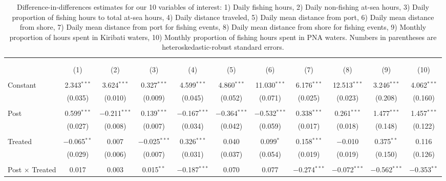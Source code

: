 
\begin{table}[H] \centering 
  \caption{\label{tab:DID_without_USA_TWN}Difference-in-differences estimates for our 10 variables of interest: 1) Daily fishing hours, 2) Daily non-fishing at-sea hours, 3) Daily proportion of fishing hours to total at-sea hours, 4) Daily distance traveled, 5) Daily mean distance from port, 6) Daily mean distance from shore, 7) Daily mean distance from port for fishing events, 8) Daily mean distance from shore for fishing events, 9) Monthly proportion of hours spent in Kiribati waters, 10) Monthly proportion of fishing hours spent in PNA waters. Numbers in parentheses are heteroskedastic-robust standard errors.} 
  \label{} 
\footnotesize 
\begin{tabular}{@{\extracolsep{1pt}}lcccccccccc} 
\\[-1.8ex]\hline 
\hline \\[-1.8ex] 
\\[-1.8ex] & (1) & (2) & (3) & (4) & (5) & (6) & (7) & (8) & (9) & (10)\\ 
\hline \\[-1.8ex] 
 Constant & 2.343$^{***}$ & 3.624$^{***}$ & 0.327$^{***}$ & 4.599$^{***}$ & 4.860$^{***}$ & 11.030$^{***}$ & 6.176$^{***}$ & 12.513$^{***}$ & 3.246$^{***}$ & 4.062$^{***}$ \\ 
  & (0.035) & (0.010) & (0.009) & (0.045) & (0.052) & (0.071) & (0.025) & (0.023) & (0.208) & (0.160) \\ 
  & & & & & & & & & & \\ 
 Post & 0.599$^{***}$ & $-$0.211$^{***}$ & 0.139$^{***}$ & $-$0.167$^{***}$ & $-$0.364$^{***}$ & $-$0.532$^{***}$ & 0.338$^{***}$ & 0.261$^{***}$ & 1.477$^{***}$ & 1.457$^{***}$ \\ 
  & (0.027) & (0.008) & (0.007) & (0.034) & (0.042) & (0.059) & (0.017) & (0.018) & (0.148) & (0.122) \\ 
  & & & & & & & & & & \\ 
 Treated & $-$0.065$^{**}$ & 0.007 & $-$0.025$^{***}$ & 0.326$^{***}$ & 0.040 & 0.099$^{*}$ & 0.158$^{***}$ & $-$0.010 & 0.375$^{**}$ & 0.116 \\ 
  & (0.029) & (0.006) & (0.007) & (0.031) & (0.037) & (0.054) & (0.019) & (0.019) & (0.150) & (0.126) \\ 
  & & & & & & & & & & \\ 
 Post $\times$ Treated & 0.017 & 0.003 & 0.015$^{**}$ & $-$0.187$^{***}$ & 0.070 & 0.077 & $-$0.274$^{***}$ & $-$0.072$^{***}$ & $-$0.562$^{***}$ & $-$0.353$^{**}$ \\ 

\end{tabular}
\end{table}
